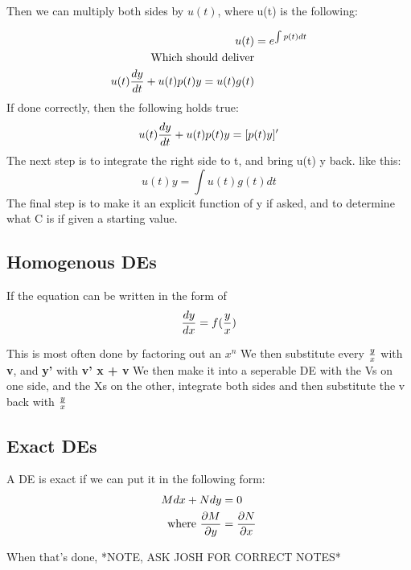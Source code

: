 \documentclass[17pt]{extarticle} %
\begin{document}
Then we can multiply both sides by $u(t)$, where u(t) is the following:  

$$
\begin{aligned}
u(t) &= e^{\int p(t)dt} \\
\text{Which should deliver} \\
u(t) {dy\over dt} + u(t) p(t) y = u(t) g(t)   
\end{aligned}
$$
If done correctly, then the following holds true:
$$
u(t) {dy\over dt} + u(t) p(t) y = [p(t) y]'
$$
The next step is to integrate the right side to t, and bring u(t) y back. 
like this:
$$
u(t) y = \int u(t) g(t) dt
$$
The final step is to make it an explicit function of y if asked, and to determine what C is if given a starting value.

\subsection{Homogenous DEs}
If the equation can be written in the form of 
$$
{dy \over dx} = f({y \over x})
$$

This is most often done by factoring out an $x^n$
We then substitute every \textbf{${y\over x}$} with \textbf{v}, and \textbf{y'} with \textbf{v' x + v}
We then make it into a seperable DE with the Vs on one side, and the Xs on the other, integrate both sides and then substitute the v back with ${y \over x}$
\subsection{Exact DEs}
A DE is exact if we can put it in the following form:
$$
\begin{aligned}
    M dx + N dy &= 0\\
    \text{where } \frac{\partial M}{\partial y} &= {\partial N \over \partial x}
\end{aligned}
$$

When that's done, 
*NOTE, ASK JOSH FOR CORRECT NOTES*
\end{document}
